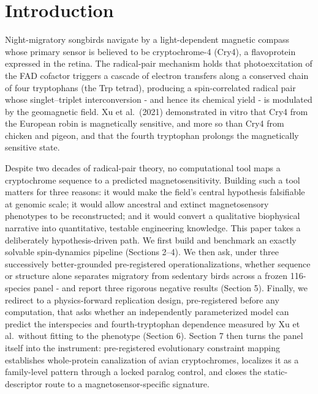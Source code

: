 \documentclass[12pt,a4paper]{article}
\begin{document}
\section{Introduction}
Night-migratory songbirds navigate by a light-dependent magnetic compass whose primary sensor is believed to be cryptochrome-4 (Cry4), a flavoprotein expressed in the retina. The radical-pair mechanism holds that photoexcitation of the FAD cofactor triggers a cascade of electron transfers along a conserved chain of four tryptophans (the Trp tetrad), producing a spin-correlated radical pair whose singlet--triplet interconversion - and hence its chemical yield - is modulated by the geomagnetic field. Xu et al.\ (2021) demonstrated in vitro that Cry4 from the European robin is magnetically sensitive, and more so than Cry4 from chicken and pigeon, and that the fourth tryptophan prolongs the magnetically sensitive state.

Despite two decades of radical-pair theory, no computational tool maps a cryptochrome sequence to a predicted magnetosensitivity. Building such a tool matters for three reasons: it would make the field's central hypothesis falsifiable at genomic scale; it would allow ancestral and extinct magnetosensory phenotypes to be reconstructed; and it would convert a qualitative biophysical narrative into quantitative, testable engineering knowledge. This paper takes a deliberately hypothesis-driven path. We first build and benchmark an exactly solvable spin-dynamics pipeline (Sections 2--4). We then ask, under three successively better-grounded pre-registered operationalizations, whether sequence or structure alone separates migratory from sedentary birds across a frozen 116-species panel - and report three rigorous negative results (Section 5). Finally, we redirect to a physics-forward replication design, pre-registered before any computation, that asks whether an independently parameterized model can predict the interspecies and fourth-tryptophan dependence measured by Xu et al.\ without fitting to the phenotype (Section 6). Section 7 then turns the panel itself into the instrument: pre-registered evolutionary constraint mapping establishes whole-protein canalization of avian cryptochromes, localizes it as a family-level pattern through a locked paralog control, and closes the static-descriptor route to a magnetosensor-specific signature.
\end{document}
